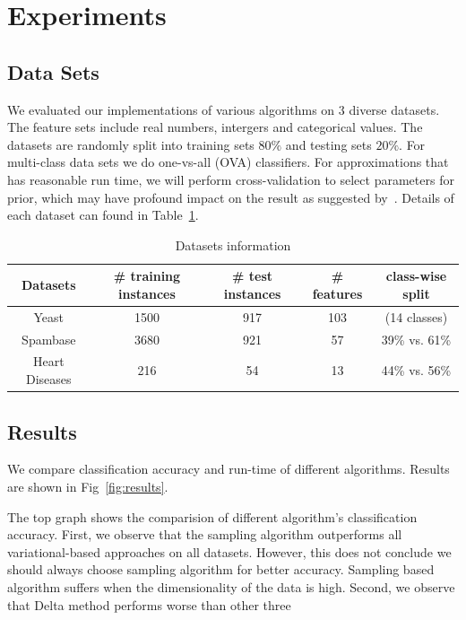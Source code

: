 \section{Experiments}
\label{sec:experiments}

\subsection{Data Sets}

We evaluated our implementations of various algorithms on 3 diverse datasets. The feature sets include real numbers, intergers and categorical values. The datasets are randomly split into training sets $80\%$ and
testing sets $20\%$. For multi-class data sets we do one-vs-all (OVA)
classifiers. For approximations that has reasonable run time, we will perform
cross-validation to select parameters for prior, which may have profound
impact on the result as suggested by~\cite{Asuncion2009smoothing}. Details of each dataset can found in Table~\ref{tb:datasets}.

\begin{table}
\begin{tabular}{| c | c |  c | c | c |}
  \hline
  Datasets & \# training instances & \# test instances & \# features & class-wise split\\
  \hline
  Yeast & 1500 & 917 & 103 & (14 classes) \\
  \hline
  Spambase & 3680 & 921 & 57 & 39\% vs. 61\% \\
  \hline
  Heart Diseases & 216 & 54 & 13 & 44\% vs. 56\% \\
  \hline
\end{tabular}

\caption{Datasets information}
\label{tb:datasets}
\end{table}

\subsection{Results}

We compare classification accuracy and run-time of different algorithms. Results are shown in Fig~\ref{fig:results}.

The top graph shows the comparision of different algorithm's classification accuracy. First, we observe that the sampling algorithm outperforms all variational-based approaches on all datasets. However, this does not conclude we should always choose sampling algorithm for better accuracy. Sampling based algorithm suffers when the dimensionality of the data is high. Second, we observe that Delta method performs worse than other three


